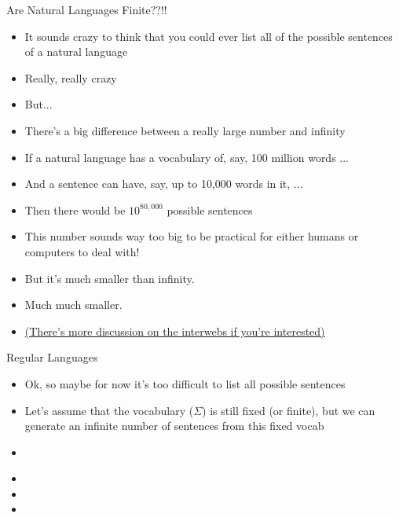 \documentclass{beamer}
\begin{document}
\begin{frame}{Are Natural Languages Finite??!!}
\begin{block}{}
\begin{itemize}
	\item It sounds crazy to think that you could ever list all of the possible sentences of a natural language
	\pause
	\item Really, really crazy
	\pause
	\item But...
	\pause
	\item There's a big difference between a really large number and infinity
	\pause
	\item {\small If a natural language has a vocabulary of, say, 100 million words ...}
	\pause
	\item And a sentence can have, say, up to 10,000 words in it, ...
	\pause
	\item Then there would be $10^{80,000}$ possible sentences
	\pause
	\item This number sounds way too big to be practical for either humans or computers to deal with!
	\pause
	\item But it's much smaller than infinity.
	\pause
	\item Much much smaller.
	\pause
	\item \tiny{\href{http://people.umass.edu/~partee/726_04/lectures/Is_Language_Infinite.pdf}{(There's more discussion on the interwebs if you're interested)}}
\end{itemize}
\end{block}
\end{frame}


\begin{frame}{Regular Languages}
\begin{block}{}
\begin{itemize}
	\item Ok, so maybe for now it's too difficult to list all possible sentences
	\item Let's assume that the vocabulary ($\Sigma$) is still fixed (or finite), but we can generate an infinite number of sentences from this fixed vocab
	\item 
\end{itemize}
\end{block}
\end{frame}


\begin{frame}{}
\begin{block}{}
\begin{itemize}
	\item 
	\item 
	\item 
\end{itemize}
\end{block}
\end{frame}
\end{document}
